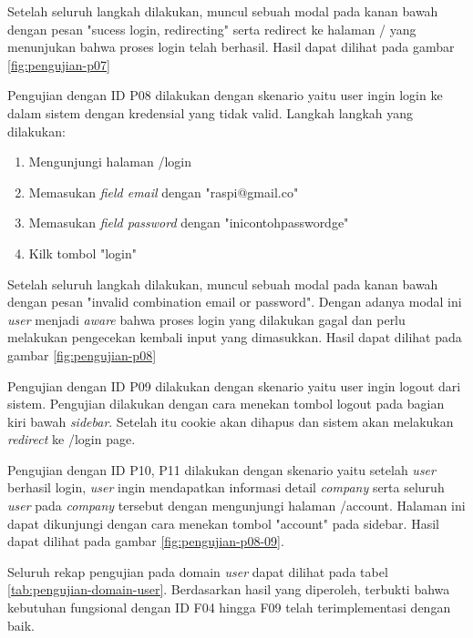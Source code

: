 Setelah seluruh langkah dilakukan, muncul sebuah modal pada kanan bawah dengan pesan "sucess login, redirecting" serta redirect ke halaman / yang menunjukan bahwa proses login telah berhasil. Hasil dapat dilihat pada gambar \ref{fig:pengujian-p07}

Pengujian dengan ID P08 dilakukan dengan skenario yaitu user ingin login ke dalam sistem dengan kredensial yang tidak valid. Langkah langkah yang dilakukan:

\begin{enumerate}
  \item Mengunjungi halaman /login
  \item Memasukan \textit{field email} dengan "raspi@gmail.co"
  \item Memasukan \textit{field password} dengan "inicontohpasswordge"
  \item Kilk tombol "login"
\end{enumerate}

Setelah seluruh langkah dilakukan, muncul sebuah modal pada kanan bawah dengan pesan "invalid combination email or password". Dengan adanya modal ini \textit{user} menjadi \textit{aware} bahwa proses login yang dilakukan gagal dan perlu melakukan pengecekan kembali input yang dimasukkan. Hasil dapat dilihat pada gambar \ref{fig:pengujian-p08}

Pengujian dengan ID P09 dilakukan dengan skenario yaitu user ingin logout dari sistem. Pengujian dilakukan dengan cara menekan tombol logout pada bagian kiri bawah \textit{sidebar}. Setelah itu cookie akan dihapus dan sistem akan melakukan \textit{redirect} ke /login page.

Pengujian dengan ID P10, P11 dilakukan dengan skenario yaitu setelah \textit{user} berhasil login, \textit{user} ingin mendapatkan informasi detail \textit{company} serta seluruh \textit{user} pada \textit{company} tersebut dengan mengunjungi halaman /account. Halaman ini dapat dikunjungi dengan cara menekan tombol "account" pada sidebar. Hasil dapat dilihat pada gambar \ref{fig:pengujian-p08-09}.

Seluruh rekap pengujian pada domain \textit{user} dapat dilihat pada tabel \ref{tab:pengujian-domain-user}. Berdasarkan hasil yang diperoleh, terbukti bahwa kebutuhan fungsional dengan ID F04 hingga F09 telah terimplementasi dengan baik.


